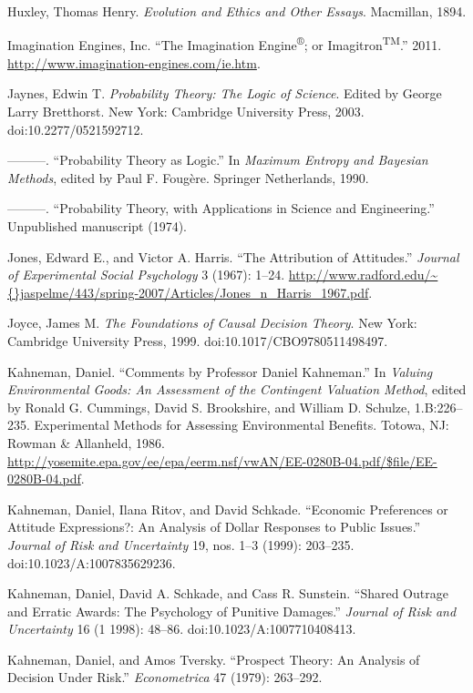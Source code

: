 \documentclass[letterpaper]{book}
\begin{document}
{
 Huxley, Thomas Henry. \textit{Evolution and Ethics and Other
Essays}. Macmillan, 1894.}

{
 Imagination Engines, Inc. ``The Imagination
Engine\textsuperscript{®}; or
Imagitron\textsuperscript{TM}.'' 2011.
\url{http://www.imagination-engines.com/ie.htm}.}

{
 Jaynes, Edwin T. \textit{Probability Theory: The Logic of
Science}. Edited by George Larry Bretthorst. New York: Cambridge
University Press, 2003. doi:10.2277/0521592712.}

{
 {}---{}---{}---. ``Probability Theory as
Logic.'' In \textit{Maximum Entropy and Bayesian
Methods}, edited by Paul F. Fougère. Springer Netherlands, 1990.}

{
 {}---{}---{}---. ``Probability Theory, with
Applications in Science and Engineering.''
Unpublished manuscript (1974).}

{
 Jones, Edward E., and Victor A. Harris. ``The
Attribution of Attitudes.'' \textit{Journal of
Experimental Social Psychology} 3 (1967): 1--24.
\url{http://www.radford.edu/\~{}jaspelme/443/spring-2007/Articles/Jones\_n\_Harris\_1967.pdf}.}

{
 Joyce, James M. \textit{The Foundations of Causal Decision
Theory}. New York: Cambridge University Press, 1999.
doi:10.1017/CBO9780511498497.}

{
 Kahneman, Daniel. ``Comments by Professor Daniel
Kahneman.'' In \textit{Valuing Environmental Goods:
An Assessment of the Contingent Valuation Method}, edited by Ronald G.
Cummings, David S. Brookshire, and William D. Schulze, 1.B:226--235.
Experimental Methods for Assessing Environmental Benefits. Totowa, NJ:
Rowman \& Allanheld, 1986.
\url{http://yosemite.epa.gov/ee/epa/eerm.nsf/vwAN/EE-0280B-04.pdf/\$file/EE-0280B-04.pdf}.}

{
 Kahneman, Daniel, Ilana Ritov, and David Schkade.
``Economic Preferences or Attitude Expressions?: An
Analysis of Dollar Responses to Public Issues.''
\textit{Journal of Risk and Uncertainty} 19, nos. 1--3 (1999):
203--235. doi:10.1023/A:1007835629236.}

{
 Kahneman, Daniel, David A. Schkade, and Cass R. Sunstein.
``Shared Outrage and Erratic Awards: The Psychology of
Punitive Damages.'' \textit{Journal of Risk and
Uncertainty} 16 (1 1998): 48--86. doi:10.1023/A:1007710408413.}

{
 Kahneman, Daniel, and Amos Tversky. ``Prospect
Theory: An Analysis of Decision Under Risk.''
\textit{Econometrica} 47 (1979): 263--292.}
\end{document}
